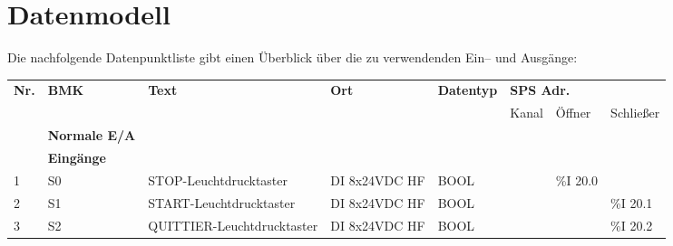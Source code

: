 \section{Datenmodell}

Die nachfolgende Datenpunktliste gibt einen Überblick über die zu verwendenden Ein– und Ausgänge:

\begin{table}[H]
    \tiny
    \begin{longtable}{|llllllll|}
        \hline
        \multicolumn{1}{|l|}{\multirow{2}{*}{\textbf{Nr.}}} &
        \multicolumn{1}{l|}{\multirow{2}{*}{\textbf{BMK}}} &
        \multicolumn{1}{l|}{\multirow{2}{*}{\textbf{Text}}} &
        \multicolumn{1}{l|}{\multirow{2}{*}{\textbf{Ort}}} &
        \multicolumn{1}{l|}{\multirow{2}{*}{\textbf{Datentyp}}} &
        \multicolumn{3}{l|}{\textbf{SPS Adr.}} \\ \cline{6-8}
        \multicolumn{1}{|l|}{} & \multicolumn{1}{l|}{} & \multicolumn{1}{l|}{} & \multicolumn{1}{l|}{} &\multicolumn{1}{l|}{} & \multicolumn{1}{l|}{Kanal} & \multicolumn{1}{l|}{Öffner} & Schließer \\ \hline
        \endfirsthead
        \endhead
        \hline
        \endfoot
        \endlastfoot
        \rowcolor{grey}
        \multicolumn{3}{|l}{} & \textbf{Normale E/A} & \multicolumn{4}{l|}{} \\ \hline
        \rowcolor{lightGrey}
        & \multicolumn{7}{l|}{\textbf{Eingänge}} \\ \hline
        \multicolumn{1}{|l|}{1} & \multicolumn{1}{l|}{S0} & \multicolumn{1}{l|}{STOP-Leuchtdrucktaster} & \multicolumn{1}{l|}{DI 8x24VDC HF} & \multicolumn{1}{l|}{BOOL} & \multicolumn{1}{l|}{} & \multicolumn{1}{l|}{\%I 20.0} & \\
        \multicolumn{1}{|l|}{2} & \multicolumn{1}{l|}{S1} & \multicolumn{1}{l|}{START-Leuchtdrucktaster} & \multicolumn{1}{l|}{DI 8x24VDC HF} & \multicolumn{1}{l|}{BOOL} & \multicolumn{1}{l|}{} & \multicolumn{1}{l|}{} & \%I 20.1 \\
        \multicolumn{1}{|l|}{3} & \multicolumn{1}{l|}{S2} & \multicolumn{1}{l|}{QUITTIER-Leuchtdrucktaster} & \multicolumn{1}{l|}{DI 8x24VDC HF} & \multicolumn{1}{l|}{BOOL} & \multicolumn{1}{l|}{} & \multicolumn{1}{l|}{} & \%I 20.2 \\

\end{longtable}
\end{table}
